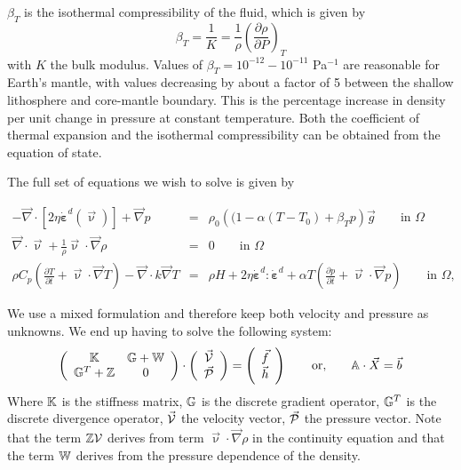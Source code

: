 $\beta_T$ is the isothermal compressibility of the fluid, which is given by 
\[
\beta_T = \frac{1}{K} = \frac{1}{\rho}\left( \frac{\partial \rho}{\partial P} \right)_T
\]
with $K$ the bulk modulus. 
Values of $\beta_T=10^{-12}-10^{-11}$ Pa$^{-1}$ are reasonable for Earth's mantle, with values decreasing by about a
factor of 5 between the shallow lithosphere and core-mantle boundary.
This is the percentage increase in density per unit change in pressure at constant temperature.
Both the coefficient of thermal expansion and the isothermal compressibility can be obtained
from the equation of state.

The full set of equations we wish to solve is given by

\begin{eqnarray}
-\vec\nabla \cdot \left[2\eta \dot{\bm \varepsilon}^d({\vec\upnu}) \right] + \vec \nabla p &=& \rho_0 \left((1 - \alpha(T-T_0) + \beta_T p \right) {\vec g} \quad\quad \textrm{in $\Omega$}  \label{eq:stokes-1a_} \\
\vec\nabla \cdot {\vec\upnu} + \frac{1}{\rho} {\vec\upnu} \cdot {\vec \nabla}\rho&=&0 \quad\quad  \textrm{in $\Omega$}   \label{eq:stokes-2a_} \\
\rho C_p \left(\frac{\partial T}{\partial t} + \vec{\upnu}\cdot \vec\nabla T\right) - \vec\nabla\cdot k\vec\nabla T   &=& 
  \rho H  +  2\eta \dot{\bm \varepsilon}^d : \dot{\bm \varepsilon}^d    +\alpha T \left( \frac{\partial p}{\partial t}+  \vec{\upnu} \cdot \vec\nabla p \right) 
\quad\quad   \textrm{in $\Omega$},
  \label{eq:temperature_}
\end{eqnarray}




We use a mixed formulation and therefore  
keep both velocity and pressure as unknowns. We end up having to solve 
the following system:
\[
\left(
\begin{array}{cc}
{\mathbb{K}} & {\mathbb{G}}+{\mathbb{W}} \\ {\mathbb{G}}^T+{\mathbb{Z}} & 0 
\end{array}
\right)
\cdot
\left(
\begin{array}{c}
\vec{\cal V} \\ \vec{\cal P}
\end{array}
\right)
=
\left(
\begin{array}{c}
\vec{f} \\ \vec{h}
\end{array}
\right)
\quad\quad
{\rm or,}
\quad\quad
{\mathbb{A}} \cdot \vec{X} = \vec{b}
\]
Where ${\mathbb{K}}$ is the stiffness matrix, ${\mathbb{G}}$ is the discrete gradient operator, 
${\mathbb{G}}^T$ is the discrete divergence operator, $\vec{\cal V}$ the velocity vector, 
$\vec{\cal P}$ the pressure vector.
Note that the term ${\mathbb{Z}}{\cal V}$ derives from term ${\vec\upnu} \cdot {\vec \nabla} \rho$ in the continuity equation
and that the term ${\mathbb{W}}$ derives from the pressure dependence of the density.

